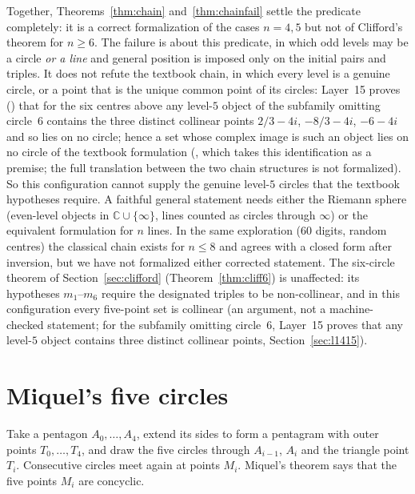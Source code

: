 \documentclass[11pt]{article}
\theoremstyle{definition}
\theoremstyle{remark}
\newcommand{\CC}{\mathbb{C}}
\begin{document}
Together, Theorems~\ref{thm:chain} and~\ref{thm:chainfail} settle the predicate completely: it is a
correct formalization of the cases $n=4,5$ but not of Clifford's theorem for $n\ge6$. The failure is
about this predicate, in which odd levels may be a circle \emph{or a line} and general position is
imposed only on the initial pairs and triples. It does not refute the textbook chain, in which every
level is a genuine circle, or a point that is the unique common point of its circles: Layer~15 proves
() that for the six centres above any level-$5$
object of the subfamily omitting circle~$6$ contains the three distinct collinear points $2/3-4i$,
$-8/3-4i$, $-6-4i$ and so lies on no circle; hence a set whose complex image is such an object lies on no
circle of the textbook formulation (, which
takes this identification as a premise; the full translation between the two chain structures is not
formalized). So this configuration cannot supply the genuine level-$5$ circles that the textbook hypotheses require. A faithful general statement needs either
the Riemann sphere (even-level objects in $\CC\cup\{\infty\}$, lines counted as circles through
$\infty$) or the equivalent formulation for $n$ lines. In the same exploration (60 digits, random
centres) the classical chain exists for $n\le8$ and agrees with a closed form after inversion, but we
have not formalized either corrected statement. The six-circle theorem of Section~\ref{sec:clifford}
(Theorem~\ref{thm:cliff6}) is unaffected: its hypotheses $m_1$--$m_6$ require the designated triples to be non-collinear, and in this
configuration every five-point set is collinear (an argument, not a machine-checked statement; for the
subfamily omitting circle~$6$, Layer~15 proves that any level-$5$ object contains three distinct collinear
points, Section~\ref{sec:l1415}).

\section{Miquel's five circles}\label{sec:five}

Take a pentagon $A_0,\dots,A_4$, extend its sides to form a pentagram with outer points
$T_0,\dots,T_4$, and draw the five circles through $A_{i-1}$, $A_i$ and the triangle point $T_i$.
Consecutive circles meet again at points $M_i$. Miquel's theorem \cite{miquel1838} says that the five
points $M_i$ are concyclic.
\end{document}
